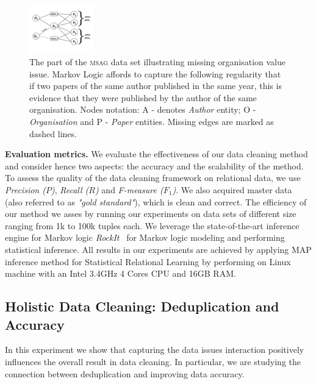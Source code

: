 \begin{figure}[t]
    \centering
    \includegraphics[width=0.25\textwidth, trim = 0mm 4mm 0mm 5mm, clip]{img/graph01.png}
    \caption{The part of the \textsc{msag} data set illustrating missing organisation value issue. Markov Logic affords to capture the following regularity that if two papers of the same author published in the same year, this is evidence that they were published by the author of the same organisation. Nodes notation: A - denotes \textit{Author} entity; O - \textit{Organisation} and P - \textit{Paper} entities. Missing edges are marked as dashed lines.}
    \label{fig:msagmissing}
\end{figure}

\textbf{Evaluation metrics.} We evaluate the effectiveness of our data cleaning method and consider hence two aspects: the accuracy and the scalability of the method. To assess the quality of the data cleaning framework on relational data, we use \textit{Precision ($P$)}, \textit{Recall ($R$)} and \textit{F-measure ($F_1$)}. We also acquired master data (also referred to as \textit{"gold standard"}), which is clean and correct. The efficiency of our method we asses by running our experiments on data sets of different size ranging from 1k to 100k tuples each. We leverage the state-of-the-art inference engine for Markov logic \textit{RockIt}~\cite{NoessnerNS13} for Markov logic modeling and performing statistical inference. All results in our experiments are achieved by applying MAP inference method for Statistical Relational Learning by performing on Linux machine with an Intel 3.4GHz 4 Cores CPU and 16GB RAM.





\subsection{Holistic Data Cleaning: Deduplication and Accuracy}
In this experiment we show that capturing the data issues interaction positively influences the overall result in data cleaning. In particular, we are studying the connection between deduplication and improving data accuracy.

